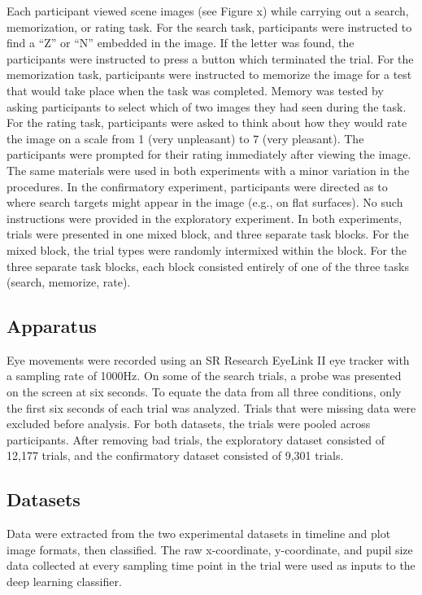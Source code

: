 \documentclass[
  english,
  man]{apa6}
\begin{document}
Each participant viewed \emph{} scene images (see Figure x) while carrying out a search, memorization, or rating task. For the search task, participants were instructed to find a \enquote{Z} or \enquote{N} embedded in the image. If the letter was found, the participants were instructed to press a button which terminated the trial. For the memorization task, participants were instructed to memorize the image for a test that would take place when the task was completed. Memory was tested by asking participants to select which of two images they had seen during the task. For the rating task, participants were asked to think about how they would rate the image on a scale from 1 (very unpleasant) to 7 (very pleasant). The participants were prompted for their rating immediately after viewing the image. The same materials were used in both experiments with a minor variation in the procedures. In the confirmatory experiment, participants were directed as to where search targets might appear in the image (e.g., on flat surfaces). No such instructions were provided in the exploratory experiment. In both experiments, trials were presented in one mixed block, and three separate task blocks. For the mixed block, the trial types were randomly intermixed within the block. For the three separate task blocks, each block consisted entirely of one of the three tasks (search, memorize, rate).

\subsection{Apparatus}

Eye movements were recorded using an SR Research EyeLink II eye tracker with a sampling rate of 1000Hz. On some of the search trials, a probe was presented on the screen at six seconds. To equate the data from all three conditions, only the first six seconds of each trial was analyzed. Trials that were missing data were excluded before analysis. For both datasets, the trials were pooled across participants. After removing bad trials, the exploratory dataset consisted of 12,177 trials, and the confirmatory dataset consisted of 9,301 trials.

\subsection{Datasets}

Data were extracted from the two experimental datasets in timeline and plot image formats, then classified. The raw x-coordinate, y-coordinate, and pupil size data collected at every sampling time point in the trial were used as inputs to the deep learning classifier.
\end{document}
